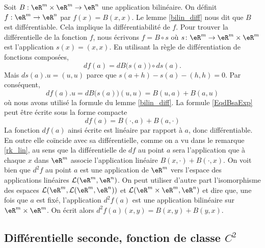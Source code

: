 \begin{example}\label{bilin_2diff}
	Soit $B:\eR^m\times \eR^m\to\eR^n$ une application bilinéaire. On définit $f:\eR^m\to\eR^n$ par $f(x)=B(x,x)$. Le lemme \ref{bilin_diff} nous dit que $B$ est différentiable. Cela implique la différentiabilité de $f$. Pour trouver la différentielle de la fonction $f$, nous écrivons $f=B\circ s$ où $s\colon \eR^m\to \eR^m\times\eR^m$ est l'application $s(x)=(x,x)$. En utilisant la règle de différentiation de fonctions composées,
	\begin{equation}
		df(a)=dB\big( s(a) \big)\circ ds(a).
	\end{equation}
	Mais $ds(a).u=(u,u)$ parce que $s(a+h)-s(a)-(h,h)=0$. Par conséquent,
	\begin{equation}		\label{EqdBsaExp}
		df(a).u=dB\big( s(a) \big)(u,u)=B(u,a)+B(a,u)
	\end{equation}
	où nous avons utilisé la formule du lemme \ref{bilin_diff}. La formule \eqref{EqdBsaExp} peut être écrite sous la forme compacte
	\begin{equation}
		df(a)=B(\cdot,a)+B(a,\cdot)
	\end{equation}
	La fonction $df(a)$ ainsi écrite est linéaire par rapport à $a$, donc différentiable. En outre elle coïncide avec sa différentielle, comme on a vu dans le remarque \ref{rk_lin}, au sens que la différentielle de $df$ au point $a$ sera l'application que à chaque $x$ dans $\eR^m$ associe l'application linéaire $B(x,\cdot)+B(\cdot, x)$. On voit bien que $d^2f$ au point $a$ est une application de $\eR^m$ vers l'espace des applications linéaires $\mathcal{L}(\eR^m, \eR^n)$. On peut utiliser d'autre part l'isomorphisme des espaces $\mathcal{L}(\eR^m,\mathcal{L}(\eR^m, \eR^n) )$ et $\mathcal{L}(\eR^m\times\eR^m, \eR^n )$ et dire que, une fois que $a$ est fixé, l'application $d^2f(a)$ est une application bilinéaire sur $\eR^m\times\eR^m$. On écrit alors $d^2f(a)(x,y)=B(x,y)+B(y,x)$.   
\end{example}

\subsection{Différentielle seconde, fonction de classe \( C^2\)}

